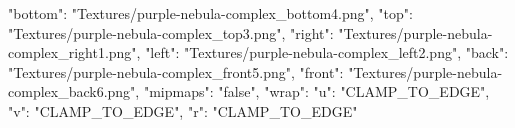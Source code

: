 {
  "bottom": "Textures/purple-nebula-complex_bottom4.png",
  "top": "Textures/purple-nebula-complex_top3.png",
  "right": "Textures/purple-nebula-complex_right1.png",
  "left": "Textures/purple-nebula-complex_left2.png",
  "back": "Textures/purple-nebula-complex_front5.png",
  "front": "Textures/purple-nebula-complex_back6.png",
  "mipmaps": "false",
  "wrap": {
    "u": "CLAMP_TO_EDGE",
    "v": "CLAMP_TO_EDGE",
    "r": "CLAMP_TO_EDGE"
  }
}